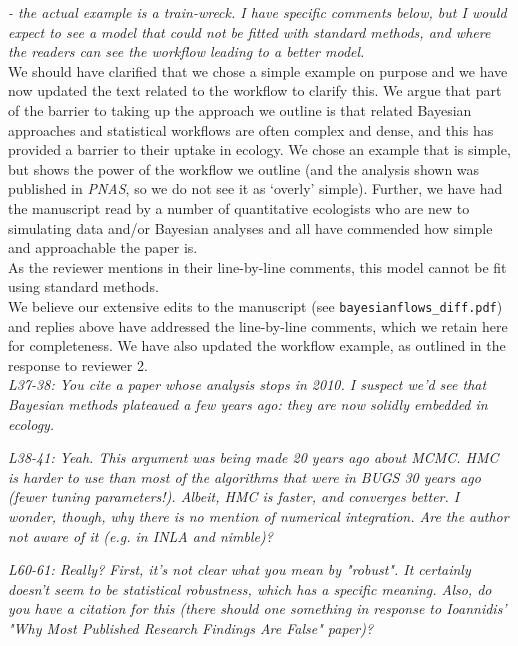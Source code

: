 \documentclass[11pt,a4paper]{article}
\begin{document}
\emph{- the actual example is a train-wreck. I have specific comments below, but I would expect to see a model that could not be fitted with standard methods, and where the readers can see the workflow leading to a better model.}\\

We should have clarified that we chose a simple example on purpose and we have now updated the text related to the workflow to clarify this. We argue that part of the barrier to taking up the approach we outline is that related Bayesian approaches and statistical workflows are often complex and dense, and this has provided a barrier to their uptake in ecology. We chose an example that is simple, but shows the power of the workflow we outline (and the analysis shown was published in \emph{PNAS}, so we do not see it as `overly' simple). Further, we have had the manuscript read by a number of quantitative ecologists who are new to simulating data and/or Bayesian analyses and all have commended how simple and approachable the paper is. \\

As the reviewer mentions in their line-by-line comments, this model cannot be fit using standard methods. \\

We believe our extensive edits to the manuscript (see \verb|bayesianflows_diff.pdf|) and replies above have addressed the line-by-line comments, which we retain here for completeness. We have also updated the workflow example, as outlined in the response to reviewer 2. \\

\emph{L37-38: You cite a paper whose analysis stops in 2010. I suspect we'd see that Bayesian methods plateaued a few years ago: they are now solidly embedded in ecology.}

\emph{L38-41: Yeah. This argument was being made 20 years ago about MCMC. HMC is harder to use than most of the algorithms that were in BUGS 30 years ago (fewer tuning parameters!). Albeit, HMC is faster, and converges better. I wonder, though, why there is no mention of numerical integration. Are the author not aware of it (e.g. in INLA and nimble)?}

\emph{L60-61: Really? First, it's not clear what you mean by "robust". It certainly doesn't seem to be statistical robustness, which has a specific meaning. Also, do you have a citation for this (there should one something in response to Ioannidis' "Why Most Published Research Findings Are False" paper)?}
\end{document}
